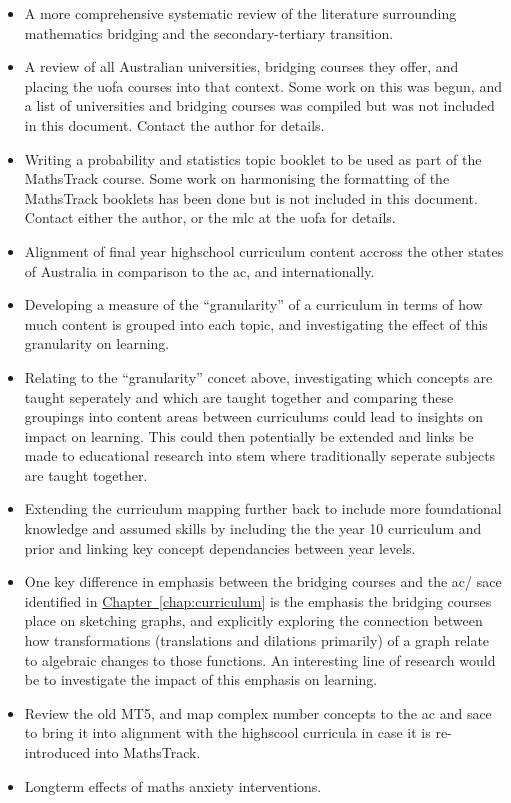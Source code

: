 \documentclass[twoside,12pt,a4paper]{report}
\newcommand{\refchap}[1]{\hyperref[chap:#1]{Chapter~\ref{chap:#1}}}
\begin{document}
\begin{itemize}
	\item A more comprehensive systematic review of the literature surrounding mathematics bridging and the secondary-tertiary transition.
	\item A review of all Australian universities, bridging courses they offer, and placing the \gls{uofa} courses into that context. Some work on this was begun, and a list of universities and bridging courses was compiled but was not included in this document. Contact the author for details.
	\item Writing a probability and statistics topic booklet to be used as part of the MathsTrack course. Some work on harmonising the formatting of the MathsTrack booklets has been done but is not included in this document. Contact either the author, or the \gls{mlc} at the \gls{uofa} for details.
	\item Alignment of final year highschool curriculum content accross the other states of Australia in comparison to the \gls{ac}, and internationally.
	\item Developing a measure of the ``granularity'' of a curriculum in terms of how much content is grouped into each topic, and investigating the effect of this granularity on learning.
	\item Relating to the ``granularity'' concet above, investigating which concepts are taught seperately and which are taught together and comparing these groupings into content areas between curriculums could lead to insights on impact on learning. This could then potentially be extended and links be made to educational research into \gls{stem} where traditionally seperate subjects are taught together.
	\item Extending the curriculum mapping further back to include more foundational knowledge and assumed skills by including the the year 10 curriculum and prior and linking key concept dependancies between year levels.
	\item One key difference in emphasis between the bridging courses and the \gls{ac}/ \gls{sace} identified in \refchap{curriculum} is the emphasis the bridging courses place on sketching graphs, and explicitly exploring the connection between how transformations (translations and dilations primarily) of a graph relate to algebraic changes to those functions. An interesting line of research would be to investigate the impact of this emphasis on learning.
	\item Review the old MT5, and map complex number concepts to the \gls{ac} and \gls{sace} to bring it into alignment with the highscool curricula in case it is re-introduced into MathsTrack.
	\item Longterm effects of maths anxiety interventions.
\end{itemize}
\end{document}
